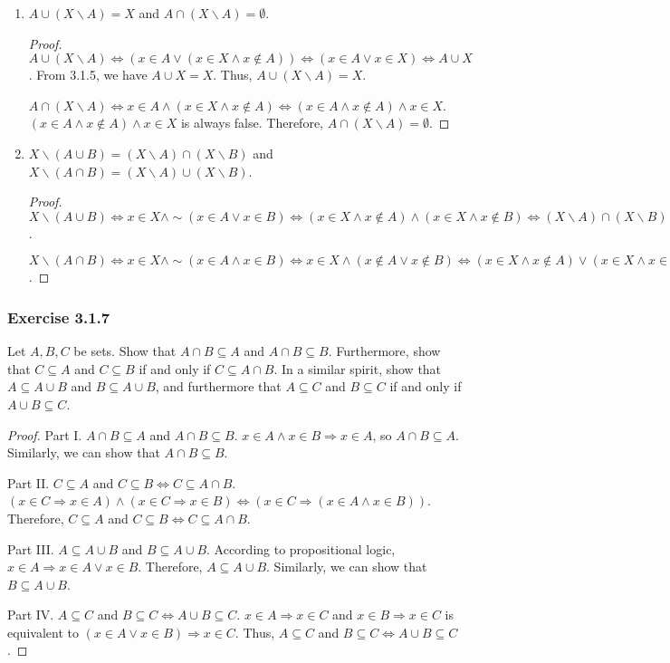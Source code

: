 \documentclass[12pt, letter]{article}
\begin{document}
\begin{enumerate}
\begin{proof}
        $x\in A\lor(x\in B\land x\in C)\iff(x\in A\lor x\in B)\land(x\in A\lor x\in C)$, $A\cap(B\cup C)=(A\cap B)\cup(A\cap C)$ and $A\cup(B\cap C)=(A\cup B)\cap(A\cup C)$
        are also true.
    \end{proof}
    \item $A\cup(X\backslash A)=X$ and $A\cap(X\backslash A)=\emptyset$.
    \begin{proof}
        $A\cup(X\backslash A)\iff (x\in A\lor(x\in X\land x\notin A))\iff(x\in A\lor x\in X)\iff A\cup X$.
        From 3.1.5, we have $A\cup X=X$. Thus, $A\cup(X\backslash A)=X$.

        $A\cap(X\backslash A)\iff x\in A\land(x\in X\land x\notin A)\iff (x\in A\land x\notin A)\land x\in X$. $(x\in A\land x\notin A)\land x\in X$ is always false. Therefore, 
        $A\cap(X\backslash A)=\emptyset$.
    \end{proof}
    \item $X\backslash(A\cup B)=(X\backslash A)\cap(X\backslash B)$ and $X\backslash(A\cap B)=(X\backslash A)\cup(X\backslash B)$.
    \begin{proof}
        $X\backslash(A\cup B)\iff x\in X\land\sim(x\in A\lor x\in B)\iff (x\in X\land x\notin A)\land (x\in X\land x\notin B)\iff (X\backslash A)\cap(X\backslash B)$.

        $X\backslash (A\cap B)\iff x\in X\land\sim(x\in A\land x\in B)\iff x\in X\land(x\notin A\lor x\notin B)\iff(x\in X\land x\notin A)\lor(x\in X\land x\in B)\iff (X\backslash A)\cup(X\backslash B)$.
    \end{proof}
\end{enumerate}
\subsubsection*{Exercise 3.1.7}
Let $A,B,C$ be sets. Show that $A\cap B\subseteq A$ and $A\cap B\subseteq B$. Furthermore, show that $C\subseteq A$ and $C\subseteq B$ if and only if $C\subseteq A\cap B$. In a similar spirit, show that 
$A\subseteq A\cup B$ and $B\subseteq A\cup B$, and furthermore that $A\subseteq C$ and $B\subseteq C$ if and only if $A\cup B\subseteq C$.
\begin{proof}
    Part I. $A\cap B\subseteq A$ and $A\cap B\subseteq B$. $x\in A\land x\in B\Rightarrow x\in A$, so $A\cap B\subseteq A$. Similarly, we can show that $A\cap B\subseteq B$.

     Part II. $C\subseteq A$ and $C\subseteq B \iff C\subseteq A\cap B$. $(x\in C\Rightarrow x\in A)\land(x\in C\Rightarrow x\in B)\iff (x\in C\Rightarrow (x\in A\land x\in B))$. Therefore, 
     $C\subseteq A$ and $C\subseteq B \iff C\subseteq A\cap B$.

     Part III. $A\subseteq A\cup B$ and $B\subseteq A\cup B$. According to propositional logic, $x\in A\Rightarrow x\in A\lor x\in B$. Therefore, $A\subseteq A\cup B$. Similarly, we can show that $B\subseteq A\cup B$.

     Part IV. $A\subseteq C$ and $B\subseteq C \iff A\cup B\subseteq C$. $x\in A\Rightarrow x\in C$ and $x\in B\Rightarrow x\in C$ is equivalent to $(x\in A\lor x\in B)\Rightarrow x\in C$. Thus, $A\subseteq C$ and $B\subseteq C\iff A\cup B\subseteq C$. 
\end{proof}
\end{document}
